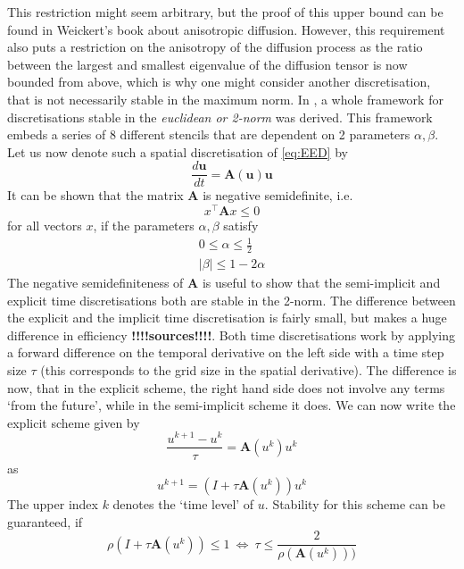 This restriction might seem arbitrary, but the proof of this upper bound can be found in
Weickert's book about anisotropic diffusion\cite{weickert96}.
However, this requirement also puts a restriction on the anisotropy of the diffusion process as the
ratio between the largest and smallest eigenvalue of the diffusion tensor is now bounded from
above, which is why one might consider another discretisation, that is not necessarily stable in
the maximum norm.
In \cite{www13}, a whole framework for discretisations stable in the
\textit{euclidean or 2-norm} was derived. This framework embeds a series of 8 different
stencils that are dependent on 2 parameters $\alpha, \beta$. Let us now denote such a spatial
discretisation of \eqref{eq:EED} by 
\begin{equation}
    \frac{d\mathbf{u}}{dt} = \mathbf{A}(\mathbf{u})\mathbf{u}
\end{equation}
It can be shown that the matrix $\mathbf{A}$ is negative semidefinite, i.e. 
\begin{equation*}
    x^\top \mathbf{A}x \leq 0
\end{equation*}
for all vectors $x$, if the parameters $\alpha,\beta$ satisfy
\begin{eqnarray}
    0 \leq \alpha \leq \frac{1}{2}\\
    \vert\beta\vert \leq 1-2\alpha
\end{eqnarray}
The negative semidefiniteness of $\mathbf{A}$ is useful to show that the semi-implicit and
explicit time discretisations both are stable in the 2-norm.
The difference between the explicit and the implicit time discretisation is fairly small, but makes
a huge difference in efficiency \textbf{!!!!sources!!!!}. Both time discretisations work by applying a forward difference on
the temporal derivative on the left side with a time step size $\tau$ (this corresponds to the grid
size in the spatial derivative). 
The difference is now, that in the explicit scheme, the right hand side does not involve any terms
`from the future', while in the semi-implicit scheme it does.
We can now write the explicit scheme given by
\begin{equation}
    \frac{u^{k+1} - u^{k}}{\tau} = \mathbf{A}(u^k)u^k
\end{equation}
as
\begin{equation}
    u^{k+1} = (I + \tau\mathbf{A}(u^k))u^k
\end{equation}
The upper index $k$ denotes the `time level' of $u$.
Stability for this scheme can be guaranteed, if 
\begin{equation}
    \rho(I + \tau\mathbf{A}(u^k)) \leq 1\ \Leftrightarrow\ \tau \leq \frac{2}{\rho(\mathbf{A}(u^k)))}
\end{equation}
